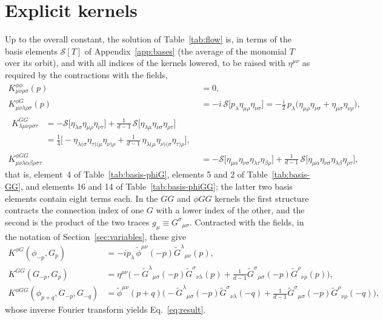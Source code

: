\documentclass[prd,aps,preprint,superscriptaddress,nofootinbib,amsmath,amssymb,eqsecnum]{revtex4-2}
\newcommand{\p}{\tilde{\phi}}
\newcommand{\G}{\tilde{G}}
\begin{document}
\section{Explicit kernels}
\label{app:kernels}

Up to the overall constant, the solution of Table~\ref{tab:flow} is, in terms of the basis
elements $\mathcal{S}[T]$ of Appendix~\ref{app:bases} (the average of the monomial $T$ over
its orbit), and with all indices of the kernels lowered, to be raised with $\eta^{\mu\nu}$
as required by the contractions with the fields,
\begin{align}
K^{\phi\phi}_{\mu\nu\rho\sigma}(p)&=0,\\
K^{\phi G}_{\mu\nu\lambda\rho\sigma}(p)&=-i\,\mathcal{S}\big[p_\lambda\eta_{\mu\rho}\eta_{\nu\sigma}\big]
=-\tfrac{i}{2}\,p_\lambda\big(\eta_{\mu\rho}\eta_{\nu\sigma}+\eta_{\mu\sigma}\eta_{\nu\rho}\big),\\
\begin{split}
K^{GG}_{\lambda\mu\nu\rho\sigma\tau}&=
-\mathcal{S}\big[\eta_{\lambda\sigma}\eta_{\mu\rho}\eta_{\nu\tau}\big]
+\frac{1}{d-1}\,\mathcal{S}\big[\eta_{\lambda\mu}\eta_{\nu\sigma}\eta_{\rho\tau}\big]\\
&=\tfrac14\Big[-\eta_{\lambda(\sigma}\eta_{\tau)(\mu}\eta_{\nu)\rho}
+\frac{1}{d-1}\,\eta_{\lambda(\mu}\eta_{\nu)(\sigma}\eta_{\tau)\rho}\Big],
\end{split}\\
K^{\phi GG}_{\mu\nu\lambda\alpha\beta\rho\sigma\tau}&=
-\mathcal{S}\big[\eta_{\mu\alpha}\eta_{\nu\sigma}\eta_{\lambda\tau}\eta_{\beta\rho}\big]
+\frac{1}{d-1}\,\mathcal{S}\big[\eta_{\mu\alpha}\eta_{\nu\sigma}\eta_{\lambda\beta}\eta_{\rho\tau}\big],
\end{align}
that is, element~4 of Table~\ref{tab:basis-phiG}, elements 5 and 2 of
Table~\ref{tab:basis-GG}, and elements 16 and 14 of Table~\ref{tab:basis-phiGG}; the latter
two basis elements contain eight terms each. In the $GG$ and $\phi GG$ kernels the first
structure contracts the connection index of one $G$ with a lower index of the other, and the
second is the product of the two traces $g_\mu\equiv G^{\sigma}{}_{\mu\sigma}$.
Contracted with the fields, in the notation of Section~\ref{sec:variables}, these give
\begin{align}
K^{\phi G}(\phi_{-p},G_p)&=-ip_\lambda\,\p^{\mu\nu}(-p)\G^{\lambda}{}_{\mu\nu}(p),\\
K^{GG}(G_{-p},G_p)&=
\eta^{\mu\nu}\Big(-\G^{\lambda}{}_{\mu\sigma}(-p)\G^{\sigma}{}_{\nu\lambda}(p)+\frac{1}{d-1}\G^{\sigma}{}_{\mu\sigma}(-p)\G^{\rho}{}_{\nu\rho}(p)\Big),\\
K^{\phi GG}(\phi_{p+q},G_{-p},G_{-q})&=
\p^{\mu\nu}(p+q)\Big(-\G^{\lambda}{}_{\mu\sigma}(-p)\G^{\sigma}{}_{\nu\lambda}(-q)+\frac{1}{d-1}\G^{\sigma}{}_{\mu\sigma}(-p)\G^{\rho}{}_{\nu\rho}(-q)\Big),
\end{align}
whose inverse Fourier transform yields Eq.~\eqref{eq:result}.
\end{document}
